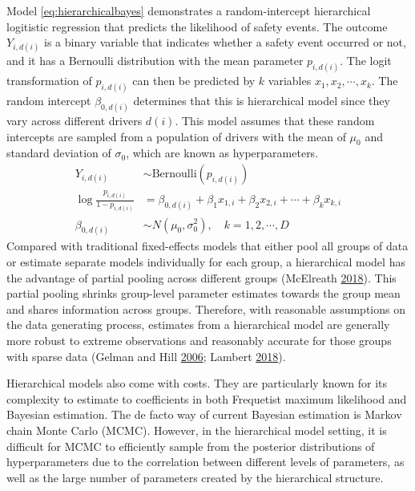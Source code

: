\documentclass[12pt]{book}
\numberwithin{equation}{chapter}
\begin{document}
Model \eqref{eq:hierarchicalbayes} demonstrates a random-intercept hierarchical logitistic regression that predicts the likelihood of safety events. The outcome \(Y_{i, d(i)}\) is a binary variable that indicates whether a safety event occurred or not, and it has a Bernoulli distribution with the mean parameter \(p_{i, d(i)}\). The logit transformation of \(p_{i, d(i)}\) can then be predicted by \(k\) variables \(x_1, x_2, \cdots, x_k\). The random intercept \(\beta_{0, d(i)}\) determines that this is hierarchical model since they vary across different drivers \(d(i)\). This model assumes that these random intercepts are sampled from a population of drivers with the mean of \(\mu_0\) and standard deviation of \(\sigma_0\), which are known as hyperparameters.
\begin{equation}
\begin{split}
Y_{i, d(i)} &\sim \text{Bernoulli}(p_{i, d(i)})\\
\log\frac{p_{i, d(i)}}{1-p_{i, d(i)}} &= \beta_{0, d(i)} + \beta_1x_{1,i} + \beta_2x_{2,i} + \cdots + \beta_kx_{k,i}\\
\beta_{0, d(i)} &\sim N(\mu_0, \sigma_0^2), \quad k = 1, 2, \cdots, D
\label{eq:hierarchicalbayes}
\end{split}
\end{equation}
Compared with traditional fixed-effects models that either pool all groups of data or estimate separate models individually for each group, a hierarchical model has the advantage of partial pooling across different groups (McElreath \protect\hyperlink{ref-mcelreath2018statistical}{2018}). This partial pooling shrinks group-level parameter estimates towards the group mean and shares information across groups. Therefore, with reasonable assumptions on the data generating process, estimates from a hierarchical model are generally more robust to extreme observations and reasonably accurate for those groups with sparse data (Gelman and Hill \protect\hyperlink{ref-gelman2006data}{2006}; Lambert \protect\hyperlink{ref-lambert2018student}{2018}).

Hierarchical models also come with costs. They are particularly known for its complexity to estimate to coefficients in both Frequetist maximum likelihood and Bayesian estimation. The de facto way of current Bayesian estimation is Markov chain Monte Carlo (MCMC). However, in the hierarchical model setting, it is difficult for MCMC to efficiently sample from the posterior distributions of hyperparameters due to the correlation between different levels of parameters, as well as the large number of parameters created by the hierarchical structure.
\end{document}
